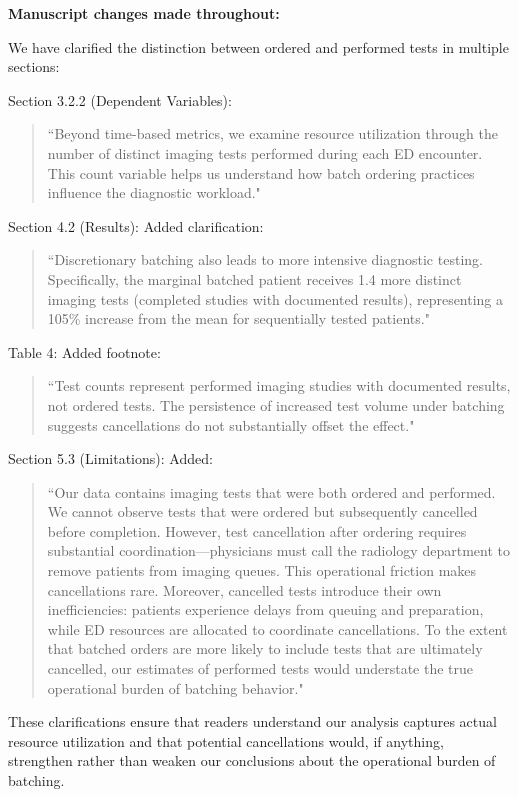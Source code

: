 \documentclass[11pt]{article}
\newcommand{\1}{\hbox{\rm 1\kern-.35em 1}}
\begin{document}
\textbf{Manuscript changes made throughout:}

We have clarified the distinction between ordered and performed tests in multiple sections:

Section 3.2.2 (Dependent Variables): 
\begin{quote}
``Beyond time-based metrics, we examine resource utilization through the number of distinct imaging tests performed during each ED encounter. This count variable helps us understand how batch ordering practices influence the diagnostic workload."
\end{quote}

Section 4.2 (Results): Added clarification: 
\begin{quote}
``Discretionary batching also leads to more intensive diagnostic testing. Specifically, the marginal batched patient receives 1.4 more distinct imaging tests (completed studies with documented results), representing a 105\% increase from the mean for sequentially tested patients."
\end{quote}

Table 4: Added footnote: 
\begin{quote}
``Test counts represent performed imaging studies with documented results, not ordered tests. The persistence of increased test volume under batching suggests cancellations do not substantially offset the effect."
\end{quote}

Section 5.3 (Limitations): Added: 
\begin{quote}
``Our data contains imaging tests that were both ordered and performed. We cannot observe tests that were ordered but subsequently cancelled before completion. However, test cancellation after ordering requires substantial coordination—physicians must call the radiology department to remove patients from imaging queues. This operational friction makes cancellations rare. Moreover, cancelled tests introduce their own inefficiencies: patients experience delays from queuing and preparation, while ED resources are allocated to coordinate cancellations. To the extent that batched orders are more likely to include tests that are ultimately cancelled, our estimates of performed tests would understate the true operational burden of batching behavior."
\end{quote}

These clarifications ensure that readers understand our analysis captures actual resource utilization and that potential cancellations would, if anything, strengthen rather than weaken our conclusions about the operational burden of batching.
\end{document}

